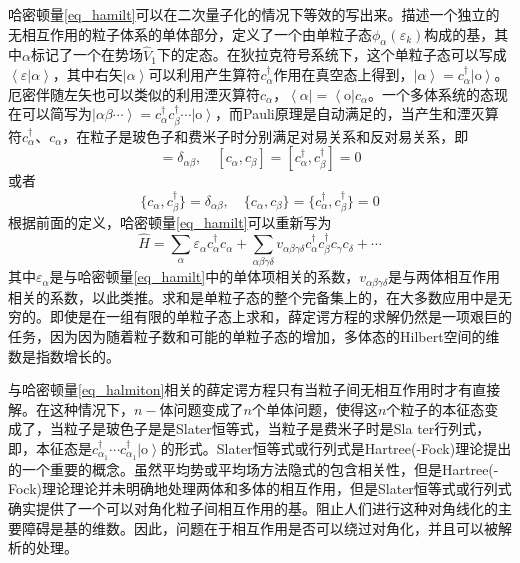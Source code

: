 哈密顿量\ref{eq_hamilt}可以在二次量子化的情况下等效的写出来。描述一个独立的无相互作用的粒子体系的单体部分，定义了一个由单粒子态$\phi_\alpha(\varepsilon_k)$构成的基，其中$\alpha$标记了一个在势场$\hat{V}_1$下的定态。在狄拉克符号系统下，这个单粒子态可以写成$\left<\varepsilon|\alpha\right>$，其中右矢$\left|\alpha\right>$可以利用产生算符$c_\alpha^\dag$作用在真空态上得到，$\left|\alpha\right>=c_\alpha^\dag\left|\textrm{o}\right>$。厄密伴随左矢也可以类似的利用湮灭算符$c_\alpha$，$\left<\alpha\right|=\left<\textrm{o}\right|c_\alpha$。一个多体系统的态现在可以简写为$\left|\alpha\beta\cdots\right>=c_\alpha^\dag c_\beta^\dag\cdots\left|\textrm{o}\right>$，而Pauli原理是自动满足的，当产生和湮灭算符$c_\alpha^\dag$、$c_\alpha$，在粒子是玻色子和费米子时分别满足对易关系和反对易关系，即
\begin{equation*}
[c_\alpha,c_\beta^\dag]=\delta_{\alpha\beta},\quad[c_\alpha,c_\beta]=[c_\alpha^\dag,c_\beta^\dag]=0
\end{equation*}
或者
\begin{equation*}
\{c_\alpha,c_\beta^\dag\}=\delta_{\alpha\beta},\quad\{c_\alpha,c_\beta\}=\{c_\alpha^\dag,c_\beta^\dag\}=0
\end{equation*}
根据前面的定义，哈密顿量\ref{eq_hamilt}可以重新写为
\begin{equation}\label{eq_halmiton}
\hat{H}=\sum_\alpha\varepsilon_\alpha c_\alpha^\dag c_\alpha+\sum_{\alpha\beta\gamma\delta}v_{\alpha\beta\gamma\delta}c_\alpha^\dag c_\beta^\dag c_\gamma c_\delta+\cdots
\end{equation}
其中$\varepsilon_\alpha$是与哈密顿量\ref{eq_hamilt}中的单体项相关的系数，$v_{\alpha\beta\gamma\delta}$是与两体相互作用相关的系数，以此类推。求和是单粒子态的整个完备集上的，在大多数应用中是无穷的。即使是在一组有限的单粒子态上求和，薛定谔方程的求解仍然是一项艰巨的任务，因为因为随着粒子数和可能的单粒子态的增加，多体态的Hilbert空间的维数是指数增长的。

与哈密顿量\ref{eq_halmiton}相关的薛定谔方程只有当粒子间无相互作用时才有直接解。在这种情况下，$n-$体问题变成了$n$个单体问题，使得这$n$个粒子的本征态变成了，当粒子是玻色子是是Slater恒等式，当粒子是费米子时是Sla	ter行列式，即，本征态是$c_{\alpha_1}^\dag\cdots c_{\alpha_1}^\dag\left|\textrm{o}\right>$的形式。Slater恒等式或行列式是Hartree(-Fock)理论提出的一个重要的概念。虽然平均势或平均场方法隐式的包含相关性，但是Hartree(-Fock)理论理论并未明确地处理两体和多体的相互作用，但是Slater恒等式或行列式确实提供了一个可以对角化粒子间相互作用的基。阻止人们进行这种对角线化的主要障碍是基的维数。因此，问题在于相互作用是否可以绕过对角化，并且可以被解析的处理。

